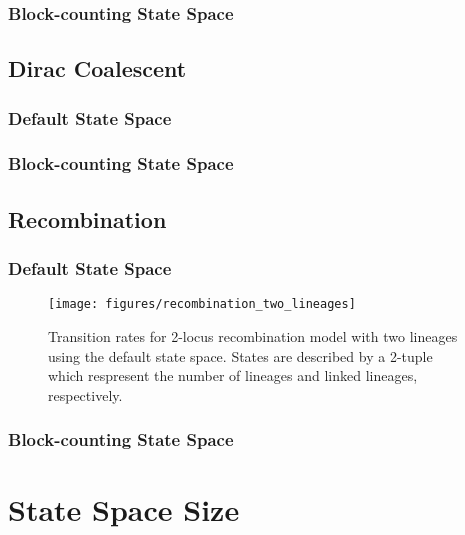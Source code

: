 \subsubsection{Block-counting State Space}\label{subsubsec:beta_coalescent_block_counting}

\subsection{Dirac Coalescent}\label{subsec:dirac-coalescent}

\subsubsection{Default State Space}\label{subsubsec:dirac_coalescent_default}

\subsubsection{Block-counting State Space}\label{subsubsec:dirac_coalescent_block_counting}

\subsection{Recombination}\label{subsec:recombination}
\subsubsection{Default State Space}\label{subsubsec:recombination_default}

\begin{figure}[H]
    \centering
    \texttt{[image: figures/recombination\_two\_lineages]}
    \caption{
        Transition rates for 2-locus recombination model with two lineages using the default state space.
        States are described by a 2-tuple which respresent the number of lineages and linked lineages, respectively.
    }
    \label{fig:recombination_two_lineages}
\end{figure}

\subsubsection{Block-counting State Space}\label{subsubsec:recombination_block_counting}


\section{State Space Size}\label{sec:state_space}

